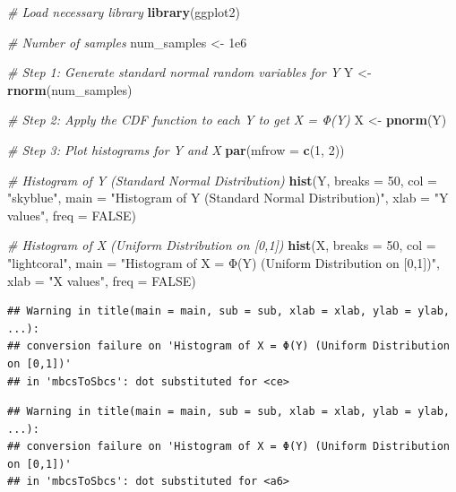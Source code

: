 \documentclass[
]{article}
\newenvironment{Shaded}{\begin{snugshade}}{\end{snugshade}}
\newcommand{\AttributeTok}[1]{\textcolor[rgb]{0.13,0.29,0.53}{#1}}
\newcommand{\CommentTok}[1]{\textcolor[rgb]{0.56,0.35,0.01}{\textit{#1}}}
\newcommand{\ConstantTok}[1]{\textcolor[rgb]{0.56,0.35,0.01}{#1}}
\newcommand{\DecValTok}[1]{\textcolor[rgb]{0.00,0.00,0.81}{#1}}
\newcommand{\FloatTok}[1]{\textcolor[rgb]{0.00,0.00,0.81}{#1}}
\newcommand{\FunctionTok}[1]{\textcolor[rgb]{0.13,0.29,0.53}{\textbf{#1}}}
\newcommand{\NormalTok}[1]{#1}
\newcommand{\OtherTok}[1]{\textcolor[rgb]{0.56,0.35,0.01}{#1}}
\newcommand{\StringTok}[1]{\textcolor[rgb]{0.31,0.60,0.02}{#1}}
\begin{document}
\begin{Shaded}
\begin{Highlighting}[]
\CommentTok{\# Load necessary library}
\FunctionTok{library}\NormalTok{(ggplot2)}

\CommentTok{\# Number of samples}
\NormalTok{num\_samples }\OtherTok{\textless{}{-}} \FloatTok{1e6}

\CommentTok{\# Step 1: Generate standard normal random variables for Y}
\NormalTok{Y }\OtherTok{\textless{}{-}} \FunctionTok{rnorm}\NormalTok{(num\_samples)}

\CommentTok{\# Step 2: Apply the CDF function to each Y to get X = Φ(Y)}
\NormalTok{X }\OtherTok{\textless{}{-}} \FunctionTok{pnorm}\NormalTok{(Y)}

\CommentTok{\# Step 3: Plot histograms for Y and X}
\FunctionTok{par}\NormalTok{(}\AttributeTok{mfrow =} \FunctionTok{c}\NormalTok{(}\DecValTok{1}\NormalTok{, }\DecValTok{2}\NormalTok{))}

\CommentTok{\# Histogram of Y (Standard Normal Distribution)}
\FunctionTok{hist}\NormalTok{(Y, }\AttributeTok{breaks =} \DecValTok{50}\NormalTok{, }\AttributeTok{col =} \StringTok{"skyblue"}\NormalTok{, }\AttributeTok{main =} \StringTok{"Histogram of Y (Standard Normal Distribution)"}\NormalTok{, }\AttributeTok{xlab =} \StringTok{"Y values"}\NormalTok{, }\AttributeTok{freq =} \ConstantTok{FALSE}\NormalTok{)}

\CommentTok{\# Histogram of X (Uniform Distribution on [0,1])}
\FunctionTok{hist}\NormalTok{(X, }\AttributeTok{breaks =} \DecValTok{50}\NormalTok{, }\AttributeTok{col =} \StringTok{"lightcoral"}\NormalTok{, }\AttributeTok{main =} \StringTok{"Histogram of X = Φ(Y) (Uniform Distribution on [0,1])"}\NormalTok{, }\AttributeTok{xlab =} \StringTok{"X values"}\NormalTok{, }\AttributeTok{freq =} \ConstantTok{FALSE}\NormalTok{)}
\end{Highlighting}
\end{Shaded}

\begin{verbatim}
## Warning in title(main = main, sub = sub, xlab = xlab, ylab = ylab, ...):
## conversion failure on 'Histogram of X = Φ(Y) (Uniform Distribution on [0,1])'
## in 'mbcsToSbcs': dot substituted for <ce>
\end{verbatim}

\begin{verbatim}
## Warning in title(main = main, sub = sub, xlab = xlab, ylab = ylab, ...):
## conversion failure on 'Histogram of X = Φ(Y) (Uniform Distribution on [0,1])'
## in 'mbcsToSbcs': dot substituted for <a6>
\end{verbatim}
\end{document}

